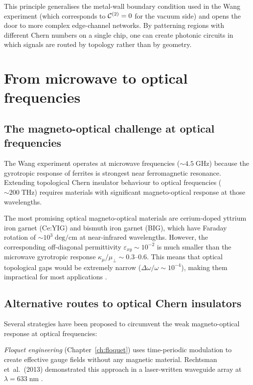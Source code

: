 This principle generalises the metal-wall boundary condition used in the
Wang experiment (which corresponds to $\mathcal{C}^{(2)}=0$ for the vacuum
side) and opens the door to more complex edge-channel networks.  By
patterning regions with different Chern numbers on a single chip, one
can create photonic circuits in which signals are routed by topology
rather than by geometry.

\section{From microwave to optical frequencies}
\label{sec:ch9-optical-scaling}

\subsection{The magneto-optical challenge at optical frequencies}
\label{sec:ch9-optical-challenge}

The Wang experiment operates at microwave frequencies ($\sim 4.5\;
\mathrm{GHz}$) because the gyrotropic response of ferrites is
strongest near ferromagnetic resonance.  Extending topological Chern
insulator behaviour to optical frequencies ($\sim 200\;\mathrm{THz}$)
requires materials with significant magneto-optical response at those
wavelengths.

The most promising optical magneto-optical materials are cerium-doped
yttrium iron garnet (Ce:YIG) and bismuth iron garnet (BIG), which have
Faraday rotation of $\sim 10^3\;\mathrm{deg/cm}$ at near-infrared
wavelengths.  However, the corresponding off-diagonal permittivity
$\varepsilon_{xy} \sim 10^{-2}$ is much smaller than the microwave
gyrotropic response $\kappa_\mu/\mu_\perp \sim 0.3$--$0.6$.  This
means that optical topological gaps would be extremely narrow
($\Delta\omega/\omega \sim 10^{-4}$), making them impractical for
most applications \cite{he2016photonic,price2022roadmap}.

\subsection{Alternative routes to optical Chern insulators}
\label{sec:ch9-optical-alternatives}

Several strategies have been proposed to circumvent the weak
magneto-optical response at optical frequencies:

\emph{Floquet engineering} (Chapter~\ref{ch:floquet}) uses
time-periodic modulation to create effective gauge fields without
any magnetic material.  Rechtsman et~al.\ (2013) demonstrated this
approach in a laser-written waveguide array at $\lambda = 633\;
\mathrm{nm}$ \cite{rechtsman2013photonic}.

